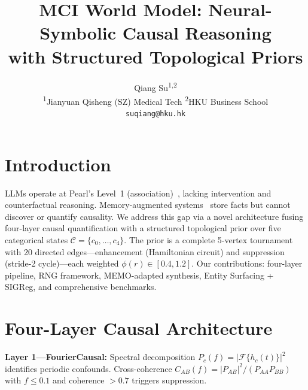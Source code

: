 \documentclass[10pt,twocolumn]{article}
\title{\small\bf MCI World Model: Neural-Symbolic Causal Reasoning\\with Structured Topological Priors}
\author{Qiang Su\textsuperscript{1,2}\\[2pt]\scriptsize\textsuperscript{1}Jianyuan Qisheng (SZ) Medical Tech \quad \textsuperscript{2}HKU Business School\\\texttt{suqiang@hku.hk}}
\date{}
\begin{document}


\section{Introduction}

LLMs operate at Pearl's Level~1 (association)~\cite{pearl2009}, lacking intervention and counterfactual reasoning. Memory-augmented systems~\cite{lewis2020,memo2025,packer2023} store facts but cannot discover or quantify causality. We address this gap via a novel architecture fusing four-layer causal quantification with a structured topological prior over five categorical states $\mathcal{C}=\{c_0,\dots,c_4\}$. The prior is a complete 5-vertex tournament with 20 directed edges---enhancement (Hamiltonian circuit) and suppression (stride-2 cycle)---each weighted $\phi(r)\in[0.4,1.2]$. Our contributions: four-layer pipeline, RNG framework, MEMO-adapted synthesis, Entity Surfacing + SIGReg, and comprehensive benchmarks.

\section{Four-Layer Causal Architecture}

\textbf{Layer 1---FourierCausal:} Spectral decomposition $P_c(f)=|\mathcal{F}\{h_c(t)\}|^2$ identifies periodic confounds. Cross-coherence $C_{AB}(f)=|P_{AB}|^2/(P_{AA}P_{BB})$ with $f\le0.1$ and coherence $>0.7$ triggers suppression.
\end{document}
